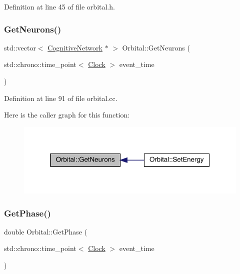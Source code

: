 Definition at line 45 of file orbital.\+h.

\mbox{\label{class_orbital_a7d7e4b7cb0d009a5e7224b6f758d7b6b}} 
\subsubsection{\texorpdfstring{Get\+Neurons()}{GetNeurons()}}
{\footnotesize\ttfamily std\+::vector$<$ \hyperlink{class_cognitive_network}{Cognitive\+Network} $\ast$ $>$ Orbital\+::\+Get\+Neurons (\begin{DoxyParamCaption}\item[{std\+::chrono\+::time\+\_\+point$<$ \hyperlink{universe_8h_a0ef8d951d1ca5ab3cfaf7ab4c7a6fd80}{Clock} $>$}]{event\+\_\+time }\end{DoxyParamCaption})}



Definition at line 91 of file orbital.\+cc.

Here is the caller graph for this function\+:
\nopagebreak
\begin{figure}[H]
\begin{center}
\leavevmode
\includegraphics[width=319pt]{class_orbital_a7d7e4b7cb0d009a5e7224b6f758d7b6b_icgraph}
\end{center}
\end{figure}
\mbox{\label{class_orbital_ad891e4a65c01e94c72ad36cda114cc2a}} 
\subsubsection{\texorpdfstring{Get\+Phase()}{GetPhase()}}
{\footnotesize\ttfamily double Orbital\+::\+Get\+Phase (\begin{DoxyParamCaption}\item[{std\+::chrono\+::time\+\_\+point$<$ \hyperlink{universe_8h_a0ef8d951d1ca5ab3cfaf7ab4c7a6fd80}{Clock} $>$}]{event\+\_\+time }\end{DoxyParamCaption})\hspace{0.3cm}{\ttfamily [inline]}}



